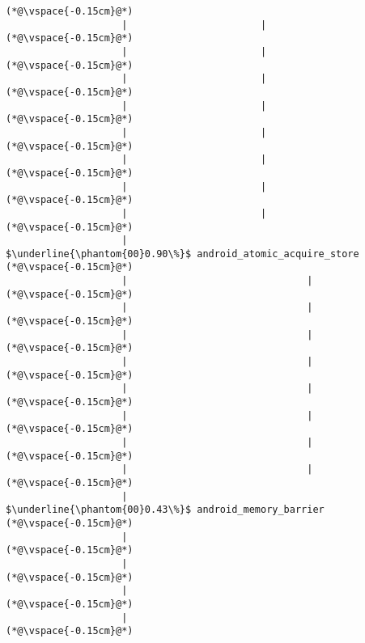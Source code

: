 \begin{lstlisting}[caption=Staattinen metodi C$\to$Java , label=profile:C2JBenchmark00001, numberbychapter=true, frame=lines, float, floatplacement=t]
(*@\vspace{-0.15cm}@*)
                    |                       |
(*@\vspace{-0.15cm}@*)
                    |                       |
(*@\vspace{-0.15cm}@*)
                    |                       |
(*@\vspace{-0.15cm}@*)
                    |                       |
(*@\vspace{-0.15cm}@*)
                    |                       |
(*@\vspace{-0.15cm}@*)
                    |                       |
(*@\vspace{-0.15cm}@*)
                    |                       |
(*@\vspace{-0.15cm}@*)
                    |                       |
(*@\vspace{-0.15cm}@*)
                    |                        $\underline{\phantom{00}0.90\%}$ android_atomic_acquire_store
(*@\vspace{-0.15cm}@*)
                    |                               |
(*@\vspace{-0.15cm}@*)
                    |                               |
(*@\vspace{-0.15cm}@*)
                    |                               |
(*@\vspace{-0.15cm}@*)
                    |                               |
(*@\vspace{-0.15cm}@*)
                    |                               |
(*@\vspace{-0.15cm}@*)
                    |                               |
(*@\vspace{-0.15cm}@*)
                    |                               |
(*@\vspace{-0.15cm}@*)
                    |                               |
(*@\vspace{-0.15cm}@*)
                    |                                $\underline{\phantom{00}0.43\%}$ android_memory_barrier
(*@\vspace{-0.15cm}@*)
                    |                
(*@\vspace{-0.15cm}@*)
                    |                
(*@\vspace{-0.15cm}@*)
                    |        
(*@\vspace{-0.15cm}@*)
                    |        
(*@\vspace{-0.15cm}@*)

\end{lstlisting}
